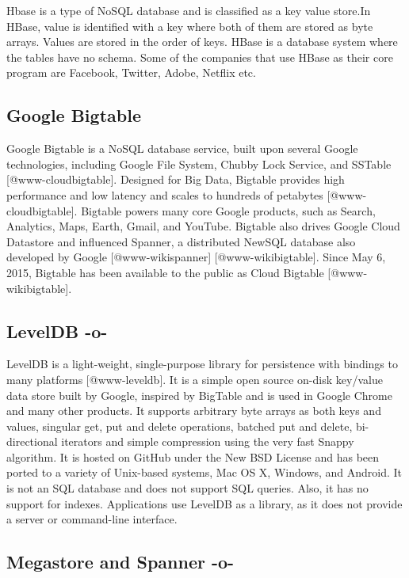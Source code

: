 Hbase is a type of NoSQL database and is classified as a key value
store.In HBase, value is identified with a key where both of them are
stored as byte arrays. Values are stored in the order of keys. HBase
is a database system where the tables have no schema. Some of the
companies that use HBase as their core program are Facebook, Twitter,
Adobe, Netflix etc.



\subsection{Google Bigtable}

Google Bigtable is a NoSQL database service, built upon several Google
technologies, including Google File System, Chubby Lock Service, and
SSTable [@www-cloudbigtable].  Designed for Big Data, Bigtable
provides high performance and low latency and scales to hundreds of
petabytes [@www-cloudbigtable]. Bigtable powers many core Google
products, such as Search, Analytics, Maps, Earth, Gmail, and
YouTube. Bigtable also drives Google Cloud Datastore and influenced
Spanner, a distributed NewSQL database also developed by Google
[@www-wikispanner] [@www-wikibigtable].  Since May 6,
2015, Bigtable has been available to the public as Cloud Bigtable
[@www-wikibigtable].

\subsection{LevelDB -o-}

LevelDB is a light-weight, single-purpose library for persistence with
bindings to many platforms [@www-leveldb]. It is a simple open
source on-disk key/value data store built by Google, inspired by
BigTable and is used in Google Chrome and many other products. It
supports arbitrary byte arrays as both keys and values, singular get,
put and delete operations, batched put and delete, bi-directional
iterators and simple compression using the very fast Snappy
algorithm. It is hosted on GitHub under the New BSD License and has
been ported to a variety of Unix-based systems, Mac OS X, Windows, and
Android. It is not an SQL database and does not support SQL
queries. Also, it has no support for indexes. Applications use LevelDB
as a library, as it does not provide a server or command-line
interface.



\subsection{Megastore and Spanner -o-}


